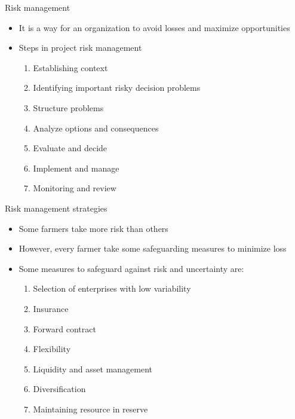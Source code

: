 \documentclass[12pt,ignorenonframetext,aspectratio=169]{beamer}
\providecommand{\tightlist}{%
  \setlength{\itemsep}{0pt}\setlength{\parskip}{0pt}}
\begin{document}
\begin{frame}{Risk management}
\protect\hypertarget{risk-management}{}
\begin{itemize}
\tightlist
\item
  It is a way for an organization to avoid losses and maximize
  opportunities
\item
  Steps in project risk management

  \begin{enumerate}
  \tightlist
  \item
    Establishing context
  \item
    Identifying important risky decision problems
  \item
    Structure problems
  \item
    Analyze options and consequences
  \item
    Evaluate and decide
  \item
    Implement and manage
  \item
    Monitoring and review
  \end{enumerate}
\end{itemize}
\end{frame}

\begin{frame}{Risk management strategies}
\protect\hypertarget{risk-management-strategies}{}
\begin{itemize}
\tightlist
\item
  Some farmers take more risk than others
\item
  However, every farmer take some safeguarding measures to minimize loss
\item
  Some measures to safeguard against risk and uncertainty are:

  \begin{enumerate}
  \tightlist
  \item
    Selection of enterprises with low variability
  \item
    Insurance
  \item
    Forward contract
  \item
    Flexibility
  \item
    Liquidity and asset management
  \item
    Diversification
  \item
    Maintaining resource in reserve
  \end{enumerate}
\end{itemize}
\end{frame}
\end{document}
